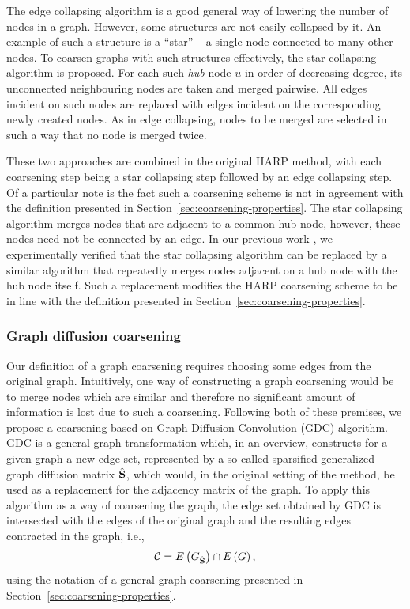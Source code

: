 \documentclass[sn-mathphys,pdflatex,iicol]{sn-jnl}%
\newcommand{\mathmat}{\ensuremath{\mathbf}}
\begin{document}
The edge collapsing algorithm is a good general way of lowering the number of nodes in a graph. However, some structures are not easily collapsed by it. An example of such a structure is a \enquote{star} -- a single node connected to many other nodes. To coarsen graphs with such structures effectively, the star collapsing algorithm is proposed. For each such \textit{hub} node \( u \) in order of decreasing degree, its unconnected neighbouring nodes are taken and merged pairwise. All edges incident on such nodes are replaced with edges incident on the corresponding newly created nodes. As in edge collapsing, nodes to be merged are selected in such a way that no node is merged twice.

These two approaches are combined in the original HARP method, with each coarsening step being a star collapsing step followed by an edge collapsing step. Of a particular note is the fact such a coarsening scheme is not in agreement with the definition presented in Section~\ref{sec:coarsening-properties}. The star collapsing algorithm merges nodes that are adjacent to a common hub node, however, these nodes need not be connected by an edge. In our previous work \cite{dedic_graph_2021}, we experimentally verified that the star collapsing algorithm can be replaced by a similar algorithm that repeatedly merges nodes adjacent on a hub node with the hub node itself. Such a replacement modifies the HARP coarsening scheme to be in line with the definition presented in Section~\ref{sec:coarsening-properties}.

\subsubsection{Graph diffusion coarsening}\label{sec:gdc-coarsening}

Our definition of a graph coarsening requires choosing some edges from the original graph. Intuitively, one way of constructing a graph coarsening would be to merge nodes which are similar and therefore no significant amount of information is lost due to such a coarsening. Following both of these premises, we propose a coarsening based on Graph Diffusion Convolution (GDC) \cite{gasteiger_diffusion_2019} algorithm. GDC is a general graph transformation which, in an overview, constructs for a given graph a new edge set, represented by a so-called sparsified generalized graph diffusion matrix \( \hat{\mathmat{S}} \), which would, in the original setting of the method, be used as a replacement for the adjacency matrix of the graph. To apply this algorithm as a way of coarsening the graph, the edge set obtained by GDC is intersected with the edges of the original graph and the resulting edges contracted in the graph, i.e.,
\[ \mathcal{C} = E \left( G_{\hat{\mathmat{S}}} \right) \cap E \left( G \right), \]
using the notation of a general graph coarsening presented in Section~\ref{sec:coarsening-properties}.
\end{document}
